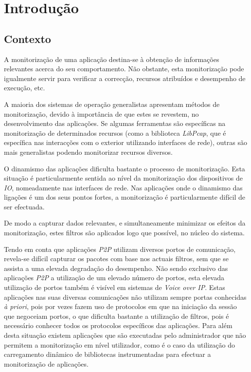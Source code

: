 \chapter{Introdução}\label{cap:introducao}

\section{Contexto}
\label{sec:intro_context}
A monitorização de uma aplicação destina-se à obtenção de informações relevantes acerca do seu comportamento.
Não obstante, esta monitorização pode igualmente servir para verificar a correcção, recursos atribuídos e desempenho de execução, etc.

A maioria dos sistemas de operação generalistas apresentam métodos de monitorização, devido à importância de que estes se revestem, no desenvolvimento das aplicações.
Se algumas ferramentas são específicas na monitorização de determinados recursos (como a biblioteca \textit{LibPcap}, que é específica nas interacções com o exterior utilizando interfaces de rede), outras são mais generalistas podendo monitorizar recursos diversos.

O dinamismo das aplicações dificulta bastante o processo de monitorização.
Esta situação é particularmente sentida ao nível da monitorização dos dispositivos de \textit{IO}, nomeadamente nas interfaces de rede.
Nas aplicações onde o dinamismo das ligações é um dos seus pontos fortes, a monitorização é particularmente difícil de ser efectuada.

De modo a capturar dados relevantes, e simultaneamente minimizar os efeitos da monitorização, estes filtros são aplicados logo que possível, no núcleo do sistema.

Tendo em conta que aplicações \textit{P2P} utilizam diversos portos de comunicação, revela-se difícil capturar os pacotes com base nos actuais filtros, sem que se assista a uma elevada degradação do desempenho.
Não sendo exclusivo das aplicações \textit{P2P} a utilização de um elevado número de portos, esta elevada utilização de portos também é visível em sistemas de \textit{Voice over IP}.
Estas aplicações nas suas diversas comunicações não utilizam sempre portas conhecidas \textit{à priori}, pois por vezes fazem uso de protocolos em que na iniciação da sessão que negoceiam portos, o que dificulta bastante a utilização de filtros, pois é necessário conhecer todos os protocolos específicos das aplicações.
Para além desta situação existem aplicações que são executadas pelo administrador que não permitem a monitorização em nível utilizador, como é o caso da utilização do carregamento dinâmico de bibliotecas instrumentadas para efectuar a monitorização de aplicações.



